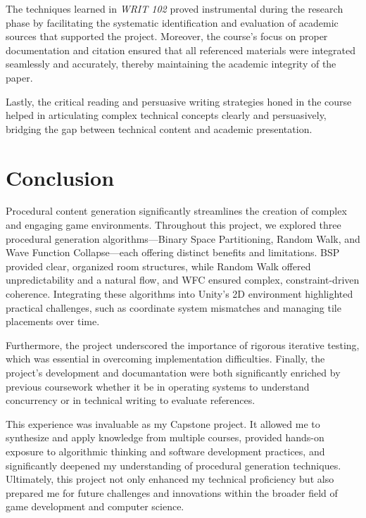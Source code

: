 \documentclass[a4paper, 12pt, one column, aas_macros]{article}
\begin{document}
The techniques learned in \textit{WRIT 102} proved instrumental during the research phase by facilitating the systematic identification and evaluation of academic sources that supported the project. Moreover, the course's focus on proper documentation and citation ensured that all referenced materials were integrated seamlessly and accurately, thereby maintaining the academic integrity of the paper.

Lastly, the critical reading and persuasive writing strategies honed in the course helped in articulating complex technical concepts clearly and persuasively, bridging the gap between technical content and academic presentation.

\section{Conclusion}
Procedural content generation significantly streamlines the creation of complex and engaging game environments. Throughout this project, we explored three procedural generation algorithms---Binary Space Partitioning, Random Walk, and Wave Function Collapse---each offering distinct benefits and limitations. BSP provided clear, organized room structures, while Random Walk offered unpredictability and a natural flow, and WFC ensured complex, constraint-driven coherence. Integrating these algorithms into Unity's 2D environment highlighted practical challenges, such as coordinate system mismatches and managing tile placements over time.

Furthermore, the project underscored the importance of rigorous iterative testing, which was essential in overcoming implementation difficulties. Finally, the project's development and documantation were both significantly enriched by previous coursework whether it be in operating systems to understand concurrency or in technical writing to evaluate references.

This experience was invaluable as my Capstone project. It allowed me to synthesize and apply knowledge from multiple courses, provided hands-on exposure to algorithmic thinking and software development practices, and significantly deepened my understanding of procedural generation techniques. Ultimately, this project not only enhanced my technical proficiency but also prepared me for future challenges and innovations within the broader field of game development and computer science.


\end{document}
